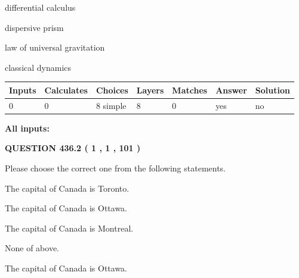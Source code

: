 \documentclass[12pt]{article}
\begin{document}
 
differential calculus
 
 
dispersive prism
 
 
law of universal gravitation
 
 
classical dynamics
 
 
\noindent{}
 
 
   
   
   
   
\noindent\begin{tabular}{|l|l|l|l|l|l|l|}
 \hline
Inputs & Calculates & Choices & Layers & Matches & Answer & Solution \\ \hline
 0  & 
 0  & 
 8
  simple  
  & 
 8  & 
 0  & 
  yes & 
  no 
  \\ \hline
 \end{tabular}
   
   
   
   
\noindent{}
   
   
   
   
\noindent\vspace{0.1in}\hspace{-0.08in} {\textbf{\Large{All inputs: }}}
   
   
  
\vspace{0.2in}
  
{\textbf{\Large{QUESTION
436.2 
 ( 1 , 1 , 101 )
}}}
  
  
Please choose the correct one from the following statements.
 
 
The capital of Canada is Toronto.
 
 
The capital of Canada is Ottawa.
 
 
The capital of Canada is Montreal.
 
 
 None of above.
 
 
\noindent{}
 
 
The capital of Canada is Ottawa.
 
 
\noindent{}
 
\end{document}
